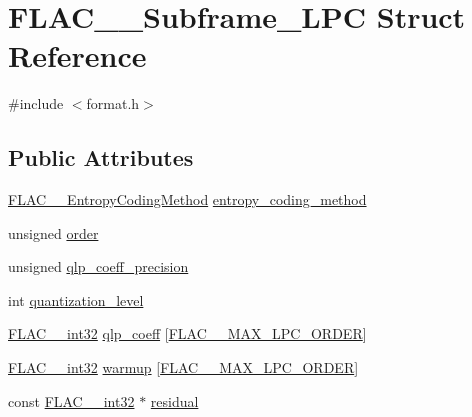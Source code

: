 \hypertarget{struct_f_l_a_c_____subframe___l_p_c}{}\section{F\+L\+A\+C\+\_\+\+\_\+\+Subframe\+\_\+\+L\+PC Struct Reference}
\label{struct_f_l_a_c_____subframe___l_p_c}


{\ttfamily \#include $<$format.\+h$>$}

\subsection*{Public Attributes}
\begin{DoxyCompactItemize}
\item 
\mbox{\hyperlink{struct_f_l_a_c_____entropy_coding_method}{F\+L\+A\+C\+\_\+\+\_\+\+Entropy\+Coding\+Method}} \mbox{\hyperlink{struct_f_l_a_c_____subframe___l_p_c_adb1401b2f8af05132420145a99f68c6e}{entropy\+\_\+coding\+\_\+method}}
\item 
unsigned \mbox{\hyperlink{struct_f_l_a_c_____subframe___l_p_c_a0de317accaf8a9f86194f97c378b2f86}{order}}
\item 
unsigned \mbox{\hyperlink{struct_f_l_a_c_____subframe___l_p_c_a6123b031203f603eba966b95fd2ad855}{qlp\+\_\+coeff\+\_\+precision}}
\item 
int \mbox{\hyperlink{struct_f_l_a_c_____subframe___l_p_c_aedcf1a3e5e62485e7ce250eda1f3e588}{quantization\+\_\+level}}
\item 
\mbox{\hyperlink{ordinals_8h_a33fd77bfe6d685541a0c034a75deccdc}{F\+L\+A\+C\+\_\+\+\_\+int32}} \mbox{\hyperlink{struct_f_l_a_c_____subframe___l_p_c_ad0b37ee925e2124a37fe3a513d5410b8}{qlp\+\_\+coeff}} \mbox{[}\mbox{\hyperlink{group__flac__format_ga16108d413f524329f338cff6e05f3aff}{F\+L\+A\+C\+\_\+\+\_\+\+M\+A\+X\+\_\+\+L\+P\+C\+\_\+\+O\+R\+D\+ER}}\mbox{]}
\item 
\mbox{\hyperlink{ordinals_8h_a33fd77bfe6d685541a0c034a75deccdc}{F\+L\+A\+C\+\_\+\+\_\+int32}} \mbox{\hyperlink{struct_f_l_a_c_____subframe___l_p_c_a91c6c71c6fc2b812da1d2a3761e29807}{warmup}} \mbox{[}\mbox{\hyperlink{group__flac__format_ga16108d413f524329f338cff6e05f3aff}{F\+L\+A\+C\+\_\+\+\_\+\+M\+A\+X\+\_\+\+L\+P\+C\+\_\+\+O\+R\+D\+ER}}\mbox{]}
\item 
const \mbox{\hyperlink{ordinals_8h_a33fd77bfe6d685541a0c034a75deccdc}{F\+L\+A\+C\+\_\+\+\_\+int32}} $\ast$ \mbox{\hyperlink{struct_f_l_a_c_____subframe___l_p_c_acae4d0d439ea8900c5771eb967aec9bf}{residual}}
\end{DoxyCompactItemize}


